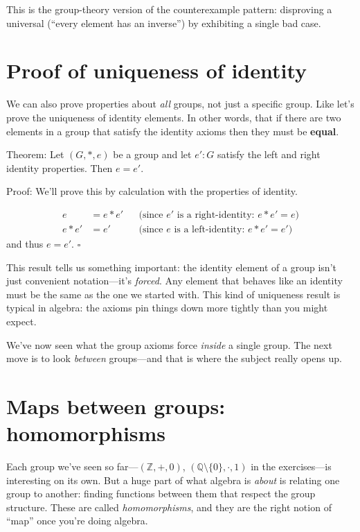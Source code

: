 \documentclass[11pt]{article}
\begin{document}
This is the group-theory version of the counterexample pattern: disproving a universal (``every element has an inverse'') by exhibiting a single bad case.

\section{Proof of uniqueness of identity}
We can also prove properties about \emph{all} groups, not just a specific group. Like let's prove the uniqueness of identity elements. In other words, that if there are two elements in a group that satisfy the identity axioms then they must be \textbf{equal}.

Theorem: Let $(G,*,e)$ be a group and let $e' : G$ satisfy the left and right identity properties. Then $e = e'$.

Proof:
We'll prove this by calculation with the properties of identity.

\begin{align*}
e &= e * e' && \text{(since $e'$ is a right-identity: $e * e' = e$)} \\
e * e' &= e' && \text{(since $e$ is a left-identity: $e * e' = e'$)}
\end{align*}
and thus $e = e'$. \hfill $\square$

\bigskip

This result tells us something important: the identity element of a group isn't just convenient notation---it's \emph{forced}. Any element that behaves like an identity must be the same as the one we started with. This kind of uniqueness result is typical in algebra: the axioms pin things down more tightly than you might expect.

We've now seen what the group axioms force \emph{inside} a single group. The next move is to look \emph{between} groups---and that is where the subject really opens up.

\section{Maps between groups: homomorphisms}

Each group we've seen so far---$(\mathbb{Z}, +, 0)$, $(\mathbb{Q} \setminus \{0\}, \cdot, 1)$ in the exercises---is interesting on its own. But a huge part of what algebra is \emph{about} is relating one group to another: finding functions between them that respect the group structure. These are called \emph{homomorphisms}, and they are the right notion of ``map'' once you're doing algebra.
\end{document}
